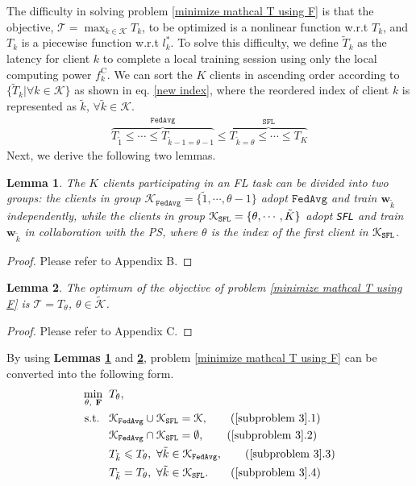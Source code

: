 \documentclass[10pt,journal,transmag]{IEEEtran}
\newtheorem{lemma}{Lemma}
\begin{document}
The difficulty in solving problem \eqref{minimize mathcal T using F} is that the objective, $\mathcal{T}=\max_{k\in\mathcal{K}}T_k$, to be optimized is a nonlinear function w.r.t $T_k$, and $T_k$ is a piecewise function w.r.t $l_k^*$. To solve this difficulty, we define $\tilde{T}_k$ as the latency for client $k$ to complete a local training session using only the local computing power $f_k^\text{C}$.
We can sort the $K$ clients in ascending order according to $\{\tilde{T}_k|\forall k \in\mathcal{K}\}$ as shown in eq. \eqref{new index}, where the reordered index of client $k$ is represented as $\tilde{k}$, $\forall \tilde{k} \in \mathcal{K}$.
\begin{align}
    \overbrace{T_{\tilde{1}} \leqslant \cdots \leqslant T_{\tilde{k}-1=\theta-1}}^\texttt{FedAvg} \leqslant \overbrace{T_{\tilde{k}=\theta} \leqslant \cdots \leqslant T_{K}}^\texttt{SFL} \label{new index}
\end{align}
Next, we derive the following two lemmas.

\begin{lemma}
    The $K$ clients participating in an FL task can be divided into two groups: the clients in group $\mathcal{K}_\texttt{FedAvg} = \{\tilde{1}, \cdots, \theta-1\}$ adopt $\texttt{FedAvg}$ and train $\textbf{w}_{\tilde{k}}$ independently, while the clients in group $\mathcal{K}_\text{\texttt{SFL}} = \{\theta, \cdots, \tilde{K} \}$ adopt \texttt{SFL} and train $\textbf{w}_{\tilde{k}}$ in collaboration with the PS, where $\theta$ is the index of the first client in $\mathcal{K}_\text{\texttt{SFL}}$.  \label{lemma 1}
\end{lemma}
\begin{proof}
    Please refer to Appendix B.
\end{proof}

\begin{lemma}
    The optimum of the objective of problem \eqref{minimize mathcal T using F} is $\mathcal{T} = T_{\theta}$, $\theta \in \tilde{\mathcal{K}}$. \label{group division}   
\end{lemma}
\begin{proof}
    Please refer to Appendix C.    
\end{proof}   
 
By using \textbf{Lemmas \ref{lemma 1}} and \textbf{\ref{group division}}, problem \eqref{minimize mathcal T using F} can be converted into the following form. 
\begin{alignat}{1}
    \min_{\theta,\ \textbf{F}} \;\; & T_{\theta}, \label{subproblem 3} \\
    \mbox{s.t.}\;\;\; 
    & \mathcal{K}_\texttt{FedAvg} \cup \mathcal{K}_\text{\texttt{SFL}} = \mathcal{K}, \tag{\ref{subproblem 3}.1}\\
    & \mathcal{K}_\texttt{FedAvg} \cap \mathcal{K}_\text{\texttt{SFL}} = \emptyset, \tag{\ref{subproblem 3}.2}\\
    & T_{\tilde{k}} \leqslant T_{\theta},\ \forall \tilde{k} \in \mathcal{K}_{\texttt{FedAvg}}, \tag{\ref{subproblem 3}.3}\\
    & T_{\tilde{k}} =T_{\theta},\ \forall \tilde{k} \in \mathcal{K}_\text{\texttt{SFL}}. \tag{\ref{subproblem 3}.4}
\end{alignat}
\end{document}
